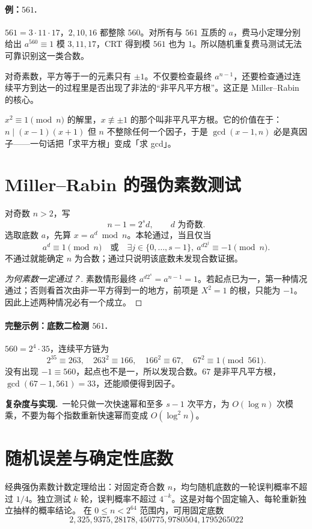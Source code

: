 \documentclass[UTF8,a4paper,11pt,oneside,openany,fontset=fandol]{ctexbook}
\theoremstyle{definition}
\newcommand{\cost}{\par\noindent\textbf{复杂度与实现.}\ }
\begin{document}
\paragraph{例：$561$.} $561=3\cdot11\cdot17$，$2,10,16$ 都整除 $560$。对所有与 $561$ 互质的 $a$，费马小定理分别给出 $a^{560}\equiv1$ 模 $3,11,17$，CRT 得到模 $561$ 也为 $1$。所以随机重复费马测试无法可靠识别这一类合数。
\begin{teach}[从必要条件寻找更强必要条件]
对奇素数，平方等于一的元素只有 $\pm1$。不仅要检查最终 $a^{n-1}$，还要检查通过连续平方到达一的过程里是否出现了非法的“非平凡平方根”。这正是 Miller--Rabin 的核心。
\end{teach}

\begin{tip}
$x^2\equiv1\pmod n$ 的解里，$x\not\equiv\pm1$ 的那个叫非平凡平方根。它的价值在于：$n\mid(x-1)(x+1)$ 但 $n$ 不整除任何一个因子，于是 $\gcd(x-1,n)$ 必是真因子——一句话把「求平方根」变成「求 gcd」。
\end{tip}



\section{Miller--Rabin 的强伪素数测试}
对奇数 $n>2$，写
\[
 n-1=2^s d,\qquad d\text{ 为奇数}.
\]
选取底数 $a$，先算 $x=a^d\bmod n$。本轮通过，当且仅当
\[
 a^d\equiv1\pmod n
 \quad\text{或}\quad
 \exists j\in\{0,\ldots,s-1\},\ a^{d2^j}\equiv-1\pmod n.
\]
不通过就能确定 $n$ 为合数；通过只说明该底数未发现合数证据。


\begin{proof}[为何素数一定通过？]
素数情形最终 $a^{d2^s}=a^{n-1}=1$。若起点已为一，第一种情况通过；否则看首次由非一平方得到一的地方，前项是 $X^2=1$ 的根，只能为 $-1$。因此上述两种情况必有一个成立。
\end{proof}
\paragraph{完整示例：底数二检测 $561$.}
$560=2^4\cdot35$，连续平方链为
\[
 2^{35}\equiv263,\quad263^2\equiv166,\quad166^2\equiv67,\quad67^2\equiv1\pmod{561}.
\]
没有出现 $-1\equiv560$，起点也不是一，所以发现合数。$67$ 是非平凡平方根，$\gcd(67-1,561)=33$，还能顺便得到因子。
\cost 一轮只做一次快速幂和至多 $s-1$ 次平方，为 $O(\log n)$ 次模乘，不要为每个指数重新快速幂而变成 $O(\log^2n)$。


\section{随机误差与确定性底数}
经典强伪素数计数定理给出：对固定奇合数 $n$，均匀随机底数的一轮误判概率不超过 $1/4$。独立测试 $k$ 轮，误判概率不超过 $4^{-k}$。这是对每个固定输入、每轮重新独立抽样的概率结论。
在 $0\le n<2^{64}$ 范围内，可用固定底数
\[
 2,325,9375,28178,450775,9780504,1795265022
\]
\end{document}
